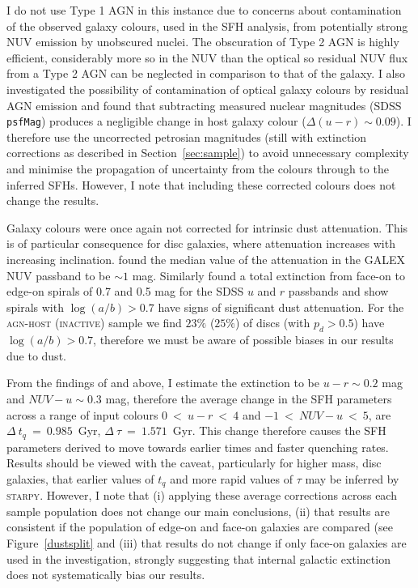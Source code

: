 I do not use Type 1 AGN in this instance due to concerns about contamination of the observed galaxy colours, used in the SFH analysis, from potentially strong NUV emission by unobscured nuclei. The obscuration of Type 2 AGN is highly efficient, considerably more so in the NUV than the optical \citep{Simmons11} so residual NUV flux from a Type 2 AGN can be neglected in comparison to that of the galaxy. I also investigated the possibility of contamination of optical galaxy colours by residual AGN emission and found that subtracting measured nuclear magnitudes (SDSS {\tt psfMag}) produces a negligible change in host galaxy colour ($\Delta(u-r) \sim 0.09$). I therefore use the uncorrected petrosian magnitudes (still with extinction corrections as described in Section~\ref{sec:sample}) to avoid unnecessary complexity and minimise the propagation of uncertainty from the colours through to the inferred SFHs. However, I note that including these corrected colours does not change the results.

Galaxy colours were once again not corrected for intrinsic dust attenuation. This is of particular consequence for disc galaxies, where attenuation increases with increasing inclination. \cite{Buat05} found the median value of the attenuation in the GALEX NUV passband to be $\sim 1$ mag. Similarly \cite{masters10a} found a total extinction from face-on to edge-on spirals of 0.7 and 0.5 mag for the SDSS $u$ and $r$ passbands and show spirals with $\log(a/b) > 0.7$ have signs of significant dust attenuation. For the \textsc{agn-host} (\textsc{inactive}) sample we find $23\%$ ($25\%$) of discs (with $p_d > 0.5$) have $\log(a/b) > 0.7$, therefore we must be aware of possible biases in our results due to dust. 

From the findings of \cite{masters10a} and \cite{Buat05} above, I estimate the extinction to be $u-r \sim 0.2$ mag and $NUV-u \sim 0.3$ mag, therefore the average change in the SFH parameters across a range of input colours $0 ~<~u-r~<~4$ and $-1~<~NUV-u~<~5$,  are $\Delta~t_q~=~0.985$~Gyr, $\Delta~\tau~=~1.571$~Gyr. This change therefore causes the SFH parameters derived to move towards earlier times and faster quenching rates. Results should be viewed with the caveat, particularly for higher mass, disc galaxies, that earlier values of $t_q$ and more rapid values of $\tau$ may be inferred by \textsc{starpy}. However, I note that (i) applying these average corrections across each sample population does not change our main conclusions, (ii) that results are consistent if the population of edge-on and face-on galaxies are compared (see Figure~\ref{dustsplit} and (iii) that results do not change if only face-on galaxies are used in the investigation, strongly suggesting that internal galactic extinction does not systematically bias our results.

